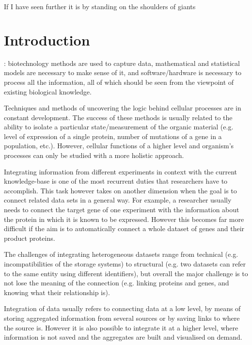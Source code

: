 \begin{savequote}[75mm] 
If I have seen further it is by standing on the shoulders of giants
\end{savequote}

\chapter{Introduction}

: biotechnology methods are used to capture data, mathematical and statistical models are necessary to make sense of it, and software/hardware is necessary to process all the information,  all of which should be seen from the viewpoint of existing biological knowledge.

Techniques and methods of uncovering the logic behind cellular processes are in constant development. The success of these methods is usually related to the ability to isolate a particular state/measurement of the organic material (e.g. level of expression of a single protein, number of mutations of a gene in a population, etc.). However,  cellular functions of a higher level and organism's processes can only be studied with a more holistic approach.

Integrating information from different experiments in context with the current knowledge-base is one of the most recurrent duties that researchers have to accomplish. This task however takes on another dimension when the goal is to connect related data sets in a general way. For example, a researcher usually needs to connect the target gene of one experiment with the information about the protein in which it is known to be expressed.  However this becomes far more difficult if the aim is to automatically connect a whole dataset of genes and their product proteins.

The challenges of integrating heterogeneous datasets range from technical (e.g. incompatibilities of the storage systems) to structural (e.g. two datasets can refer to the same entity using different identifiers), but overall the major challenge is to not lose the meaning of the connection (e.g. linking proteins and genes, and knowing what their relationship is).

Integration of data usually refers to connecting data at a low level, by means of storing aggregated information from several sources or by saving links to where the source is. However it is also possible to integrate it at a higher level, where information is not saved and the aggregates are built and visualised on demand.


